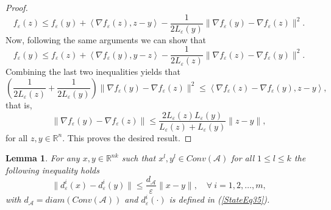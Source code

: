 \documentclass[12pt]{article}
\numberwithin{equation}{section}
\newtheorem{lemma}{Lemma}[proposition]
\begin{document}
\begin{proof}
\begin{equation*}
	f_{\varepsilon}(z) \leq f_{\varepsilon}(y) + \left\langle \nabla f_{\varepsilon}(z), z - y \right\rangle - \frac{1}{2 L_{\varepsilon}(y)} \| \nabla f_{\varepsilon}(y) - \nabla f_{\varepsilon}(z) \|^2 .
\end{equation*}
Now, following the same arguments we can show that
\begin{equation*}
	f_{\varepsilon}(y) \leq f_{\varepsilon}(z) + \left\langle \nabla f_{\varepsilon}(y), y - z \right\rangle - \frac{1}{2 L_{\varepsilon}(z)} \| \nabla f_{\varepsilon}(z) - \nabla f_{\varepsilon}(y) \|^2 .
\end{equation*}
Combining the last two inequalities yields that
\begin{equation*}
	\left( \frac{1}{2 L_{\varepsilon}(z)} + \frac{1}{2 L_{\varepsilon}(y)} \right) \| \nabla f_{\varepsilon}(y) - \nabla f_{\varepsilon}(z) \|^2 \leq \left\langle \nabla f_{\varepsilon}(z) - \nabla f_{\varepsilon}(y), z - y \right\rangle ,
\end{equation*}
that is, 
\begin{equation*}
	\| \nabla f_{\varepsilon}(y) - \nabla f_{\varepsilon}(z) \| \leq \frac{2L_{\varepsilon}(z)L_{\varepsilon}(y)}{L_{\varepsilon}(z) + L_{\varepsilon}(y)} \|z - y\| ,
\end{equation*}
for all $z,y \in \mathbb{R}^n$. This proves the desired result.
\end{proof}

\begin{lemma} \label{StateEq40}
For any $x,y \in \mathbb{R}^{nk}$ such that $x^l,y^l \in Conv(\mathcal{A})$ for all $1 \leq l \leq k$ the following inequality holds 
\begin{equation*}
	\|d_{\varepsilon}^i(x) - d_{\varepsilon}^i(y)\| \leq \frac{ d_{\mathcal{A}}}{\varepsilon}\|x-y\|, \quad \forall \: i=1, 2, \ldots ,m ,
\end{equation*}
with $d_{\mathcal{A}} = diam(Conv(\mathcal{A}))$ and $d^i_{\varepsilon}(\cdot)$ is defined in (\ref{StateEq35}).
\end{lemma}
\end{document}
